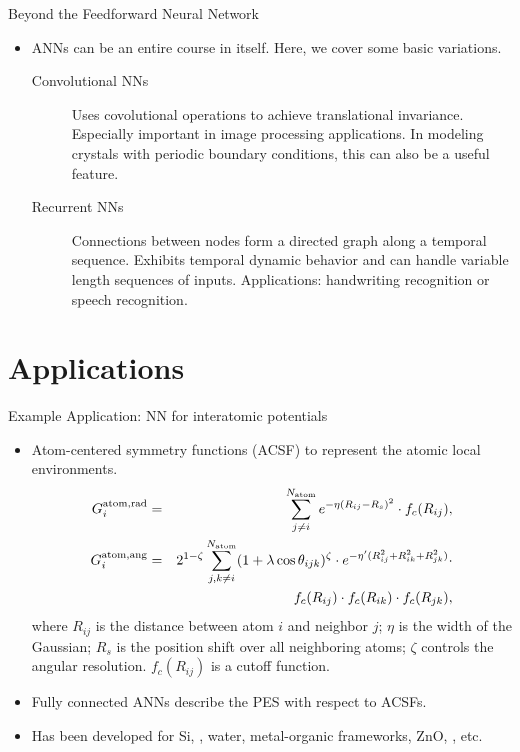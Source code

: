\documentclass{beamer}
\begin{document}
\begin{frame}{Beyond the Feedforward Neural Network}
    \begin{itemize}
        \item ANNs can be an entire course in itself. Here, we cover some basic variations.
        \begin{description}
        \item[Convolutional NNs] Uses covolutional operations to achieve translational invariance. Especially important in image processing applications. In modeling crystals with periodic boundary conditions, this can also be a useful feature.
        \item[Recurrent NNs] Connections between nodes form a directed graph along a temporal sequence. Exhibits temporal dynamic behavior and can handle variable length sequences of inputs. Applications: handwriting recognition or speech recognition.
        \end{description}
        
    \end{itemize}
\end{frame}


\section{Applications}


\begin{frame}{Example Application: NN for interatomic potentials}
    \begin{itemize}
        \item Atom-centered symmetry functions (ACSF)\cite{behlerAtomcenteredSymmetryFunctions2011} to represent the atomic local environments.
        \begin{eqnarray*}
            G_{i}^{\rm atom, \rm rad} & = & \sum_{j\neq i}^{N_{\rm atom}} e^{-\eta(R_{ij}-R_{s})^{2}} \cdot f_{c}(R_{ij}), \\
            G_{i}^{\rm atom, \rm ang} & = & 2^{1-\zeta}\sum_{j,k \neq i}^{N_{\rm atom}} (1 + \lambda \cos \theta_{ijk})^{\zeta} \cdot e^{-\eta^{\prime}(R_{ij}^{2}+R_{ik}^{2}+R_{jk}^{2})}\cdot\\
            & & f_{c}(R_{ij}) \cdot f_{c}(R_{ik}) \cdot f_{c}(R_{jk}),
        \end{eqnarray*}
        where $R_{ij}$ is the distance between atom $i$ and neighbor $j$; $\eta$ is the width of the Gaussian; $R_{s}$ is the position shift over all neighboring atoms; $\zeta$ controls the angular resolution. $f_{c}(R_{ij})$ is a cutoff function.    
        \item Fully connected ANNs describe the PES with respect to ACSFs.\cite{behlerHighDimensionalNeuralNetwork}
        \item Has been developed for Si, , water, metal-organic frameworks, ZnO, , etc.
    \end{itemize}
\end{frame}
\end{document}
